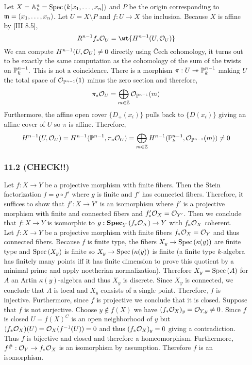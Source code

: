 \documentclass[12pt]{article}
\begin{document}
Let $X = \A^n_k = \Spec{k[x_1, \dots, x_n]}$ and $P$ be the origin corresponding to $\m = (x_1, \dots, x_n)$. Let $U = X \setminus P$ and $f : U \to X$ the inclusion. Because $X$ is affine by [III 8.5],
\[ R^{n-1} f_* \struct{U} = \wt{H^{n-1}(U, \struct{U})} \] 
We can compute $H^{n-1}(U, \struct{U}) \neq 0$ directly using \v{C}ech cohomology, it turns out to be exactly the same computation as the cohomology of the sum of the twists on $\P^{n-1}_k$. This is not a coincidence. There is a morphism $\pi : U \onto \P^{n-1}_k$ making $U$  the total space of $\struct{\P^{n-1}}(1)$ minus the zero section and therefore,
\[ \pi_* \struct{U} = \bigoplus_{m \in \Z} \struct{\P^{n-1}}(m) \]
Furthermore, the affine open cover $\{ D_+(x_i) \}$ pulls back to $\{ D(x_i) \}$ giving an affine cover of $U$ so $\pi$ is affine. Therefore,
\[ H^{n-1}(U, \struct{U}) = H^{n-1}(\P^{n-1}, \pi_* \struct{U}) = \bigoplus_{m \in \Z} H^{n-1}(\P^{n-1}_k, \struct{\P^{n-1}}(m)) \neq 0 \]

\subsubsection{11.2 (CHECK!!)}

Let $f : X \to Y$ be a projective morphism with finite fibers. Then the Stein factorization $f = g \circ f'$ where $g$ is finite and $f'$ has connected fibers. Therefore, it suffices to show that $f' : X \to Y'$ is an isomorphism where $f'$ is a projective morphism with finite and connected fibers and $f'_* \struct{X} = \struct{Y'}$. Then we conclude that $f : X \to Y$ is isomorphic to $g : \rSpec{Y}{f_* \struct{X}} \to Y$ with $f_* \struct{X}$ coherent.
\bigskip\\
Let $f : X \to Y$ be a projective morphism with finite fibers $f_* \struct{X} = \struct{Y}$ and thus connected fibers. Because $f$ is finite type, the fibers $X_y \to \Spec{\kappa(y)}$ are finite type and $\Spec{X_y}$ is finite so $X_y \to \Spec{\kappa(y)}$ is finite (a finite type $k$-algebra has finitely many points iff it has finite dimension to prove this quotient by a minimal prime and apply noetherian normalization). Therefore $X_y = \Spec{A}$ for $A$ an Artin $\kappa(y)$-algebra and thus $X_y$ is discrete. Since $X_y$ is connected, we conclude that $A$ is local and $X_y$ consists of a single point. Therefore, $f$ is injective. Furthermore, since $f$ is projective we conclude that it is closed. Suppose that $f$ is not surjective. Choose $y \notin f(X)$ we have $(f_* \struct{X})_y = \stalk{Y}{y} \neq 0$. Since $f$ is closed $U = f(X)^C$ is an open neighborhood of $y$ but $(f_* \struct{X})(U) = \struct{X}(f^{-1}(U)) =  0$ and thus $(f_* \struct{X})_y = 0$ giving a contradiction. Thus $f$ is bijective and closed and therefore a homeomorphism. Furthermore, $f^\# : \struct{Y} \to f_* \struct{X}$ is an isomorphism by assumption. Therefore $f$ is an isomorphism.
\end{document}
